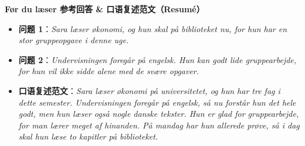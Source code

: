\begin{answerbox}
\textbf{Før du læser 参考回答 \& 口语复述范文（Resumé）}
\begin{itemize}
  \item \textbf{问题 1}：\textit{Sara læser økonomi, og hun skal på biblioteket nu, for hun har en stor gruppeopgave i denne uge.}
  \item \textbf{问题 2}：\textit{Undervisningen foregår på engelsk. Hun kan godt lide gruppearbejde, for hun vil ikke sidde alene med de svære opgaver.}
  \item \textbf{口语复述范文}：\textit{Sara læser økonomi på universitetet, og hun har tre fag i dette semester. Undervisningen foregår på engelsk, så nu forstår hun det hele godt, men hun læser også nogle danske tekster. Hun er glad for gruppearbejde, for man lærer meget af hinanden. På mandag har hun allerede prøve, så i dag skal hun læse to kapitler på biblioteket.}
\end{itemize}
\end{answerbox}
